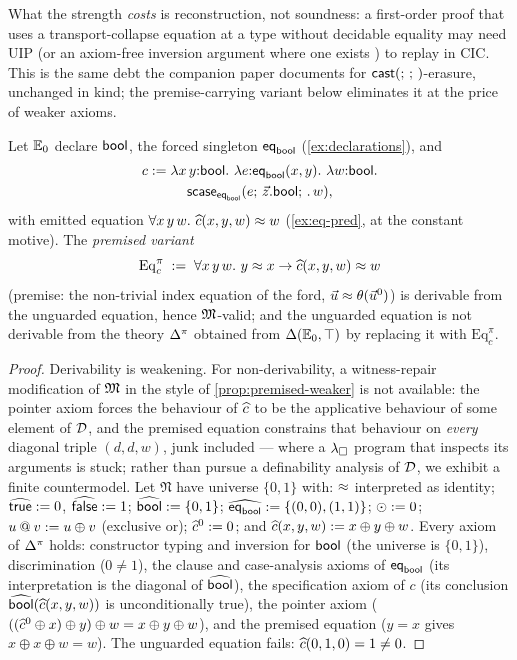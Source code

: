 What the strength \emph{costs} is reconstruction, not soundness: a
first-order proof that uses a transport-collapse equation at a type
without decidable equality may need UIP (or an axiom-free inversion
argument where one exists \cite{Monin2010,CockxDevriese2018}) to replay
in CIC.  This is the same debt the companion paper documents for
$\mathsf{cast}(;\,;\,)$-erasure, unchanged in kind; the premise-carrying variant
below eliminates it at the price of weaker axioms.

\begin{proposition}
\label{prop:guarded-scase}
Let $\mathbb{E}_0$ declare $\mathsf{bool}$, the forced singleton
$\mathsf{eq}_{\mathsf{bool}}$ (\cref{ex:declarations}), and
\begin{multline*}
  c \mathrel{:=} \lambda x\,y{:}\mathsf{bool}.\ \lambda
  e{:}\mathsf{eq}_{\mathsf{bool}}(x,y).\ \lambda w{:}\mathsf{bool}.\\
  \mathsf{scase}_{\mathsf{eq}_{\mathsf{bool}}}(e;\,\vec{z}.\mathsf{bool};\,.\,w),
\end{multline*}
with emitted equation $\forall x\,y\,w.\ \widehat{c}(x,y,w) \approx w$
(\cref{ex:eq-pred}, at the constant motive).  The \emph{premised
variant}
\[
  \mathrm{Eq}^\pi_c \;\mathrel{:=}\; \forall x\,y\,w.\ y \approx x \to
  \widehat{c}(x,y,w) \approx w
\]
(premise: the non-trivial index equation of the ford, $\vec{u} \approx
\theta(\vec{u}^0)$) is derivable from the unguarded equation, hence
$\mathfrak{M}$-valid; and the unguarded equation is not derivable from the
theory $\Delta^\pi$ obtained from $\Delta(\mathbb{E}_0, \top)$ by replacing it with
$\mathrm{Eq}^\pi_c$.
\end{proposition}

\begin{proof}
Derivability is weakening.  For non-derivability, a witness-repair
modification of $\mathfrak{M}$ in the style of \cref{prop:premised-weaker} is
not available: the pointer axiom forces the behaviour of $\widehat{c}$ to
be the applicative behaviour of some element of $\mathcal{D}$, and the
premised equation constrains that behaviour on \emph{every} diagonal
triple $(d, d, w)$, junk included --- where a $\lambda_{\square}$ program that
inspects its arguments is stuck; rather than pursue a definability
analysis of $\mathcal{D}$, we exhibit a finite countermodel.  Let
$\mathfrak{N}$ have universe $\{0,1\}$ with: $\approx$ interpreted as
identity; $\widehat{\mathsf{true}} \mathrel{:=} 0$, $\widehat{\mathsf{false}} \mathrel{:=} 1$;
$\widehat{\mathsf{bool}} \mathrel{:=} \{0,1\}$;
$\widehat{\mathsf{eq}_{\mathsf{bool}}} \mathrel{:=} \{(0,0), (1,1)\}$; $\odot \mathrel{:=} 0$;
$u \mathbin{@} v \mathrel{:=} u \oplus v$ (exclusive or); $\widehat{c}^0 \mathrel{:=} 0$;
and $\widehat{c}(x,y,w) \mathrel{:=} x \oplus y \oplus w$.  Every axiom of
$\Delta^\pi$ holds:
constructor typing and inversion for $\mathsf{bool}$ (the universe is
$\{0,1\}$), discrimination ($0 \neq 1$), the clause and case-analysis
axioms of $\mathsf{eq}_{\mathsf{bool}}$ (its interpretation is the diagonal of
$\widehat{\mathsf{bool}}$), the specification axiom of $c$ (its conclusion
$\widehat{\mathsf{bool}}(\widehat{c}(x,y,w))$ is unconditionally true), the pointer
axiom ($((\widehat{c}^0 \oplus x) \oplus y) \oplus w = x \oplus y \oplus
w$), and the premised equation ($y = x$ gives $x \oplus x \oplus w =
w$).  The unguarded equation fails: $\widehat{c}(0,1,0) = 1 \neq 0$.
\end{proof}

